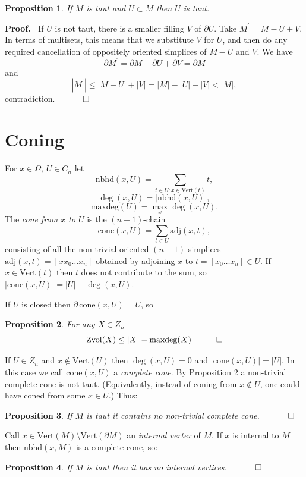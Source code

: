 \documentclass[12pt]{article}
\newtheorem{prop}{Proposition}
\newcommand{\proofstart}{{\noindent \bf Proof.\ }}
\newcommand{\mathproofend}{\quad \qed}
\newcommand{\proofend}{$\quad \qed$}
\def\del{\partial}
\newcommand{\kw}{\mathrm}
\newcommand{\cone}{\kw{cone}}
\newcommand{\maxdeg}{\kw{maxdeg}}
\newcommand{\vertices}{\kw{Vert}}
\newcommand{\nbhd}{\kw{nbhd}}
\newcommand{\adj}{\kw{adj}}
\newcommand{\Zvol}{\kw{Zvol}}
\begin{document}
\begin{prop} \label{subtaut}
If $M$ is taut and $U \subset M$ then $U$ is taut.
\end{prop}

\proofstart
If $U$ is not taut, there is a smaller filling $V$ of $\del U$.
Take $M^\prime = M-U+V$.
In terms of multisets, this means that we substitute $V$ for $U$,
and then do any required cancellation of oppositely oriented simplices
of $M-U$ and $V$.
We have
\[
\del M^\prime = \del M - \del U + \del V = \del M
\]
and
\[
|M^\prime| \leq |M-U| + |V| = |M| - |U| + |V| < |M|
,
\]
contradiction.
\proofend

\section{Coning}
For $x \in \Omega$, $U \in C_n$ let
\[
\nbhd(x,U) = \sum_{ t \in U: x \in \vertices(t) } t
,
\]
\[
\deg(x,U) = |\nbhd(x,U)|
,
\]
\[
\maxdeg(U) = \max_x \deg(x,U)
.
\]
The \emph{cone from $x$ to $U$}
is the $(n+1)$-chain
\[
\cone(x,U) = 
\sum_{t \in U} \adj(x,t)
,
\]
consisting of all the non-trivial oriented
$(n+1)$-simplices $\adj(x,t)=[x x_0\ldots x_n]$ obtained
by adjoining $x$ to  $t = [x_0\ldots x_n] \in U$.
If $x \in \vertices(t)$ then $t$ does not contribute to the sum,
so $|\cone(x,U)| = |U| - \deg(x,U)$.

If $U$ is closed then
$\del\, \cone(x,U) = U$, so

\begin{prop} \label{maxdeg}
For any $X \in Z_n$
\[
\Zvol(X) \leq |X| - \maxdeg(X)
\mathproofend
\]
\end{prop}

If $U \in Z_n$ and $x \notin \vertices(U)$ then
$\deg(x,U)=0$ and
$|\cone(x,U)| = |U|$.
In this case we call $\cone(x,U)$ a \emph{complete cone}.
By Proposition \ref{maxdeg} a non-trivial complete cone is not taut.
(Equivalently, instead of coning from
$x \notin U$, one could have coned from some $x \in U$.)
Thus:
\begin{prop}\label{nocone}
If $M$ is taut it contains no non-trivial complete cone.
\proofend
\end{prop}

Call $x \in \vertices(M) \setminus \vertices(\del M)$ an
\emph{internal vertex} of $M$.
If $x$ is internal to $M$ then $\nbhd(x,M)$ is a complete cone, so:
\begin{prop} \label{nointernal}
If $M$ is taut then
it has no internal vertices.
\proofend
\end{prop}
\end{document}
